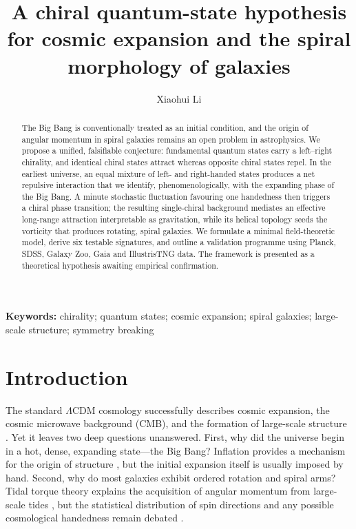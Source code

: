 \documentclass[a4paper,10pt]{article}
\title{\textbf{A chiral quantum-state hypothesis for cosmic expansion and the
       spiral morphology of galaxies}}
\author{Xiaohui Li}
\affil{Independent Researcher, Baoji 721000, China}
\affil{Correspondence: \texttt{danceluck@163.com};
       ORCID: 0009-0003-8233-7191}
\date{}
\providecommand{\keywords}[1]{%
  \vspace{0.5em}\noindent\textbf{Keywords:} #1\par\vspace{0.5em}}
\begin{document}
\maketitle

\begin{abstract}
The Big Bang is conventionally treated as an initial condition, and the origin
of angular momentum in spiral galaxies remains an open problem in
astrophysics. We propose a unified, falsifiable conjecture: fundamental
quantum states carry a left--right chirality, and identical chiral states
attract whereas opposite chiral states repel. In the earliest universe, an
equal mixture of left- and right-handed states produces a net repulsive
interaction that we identify, phenomenologically, with the expanding phase of
the Big Bang. A minute stochastic fluctuation favouring one handedness then
triggers a chiral phase transition; the resulting single-chiral background
mediates an effective long-range attraction interpretable as gravitation,
while its helical topology seeds the vorticity that produces rotating, spiral
galaxies. We formulate a minimal field-theoretic model, derive six testable
signatures, and outline a validation programme using Planck, SDSS, Galaxy
Zoo, Gaia and IllustrisTNG data. The framework is presented as a theoretical
hypothesis awaiting empirical confirmation.
\end{abstract}

\keywords{chirality; quantum states; cosmic expansion; spiral galaxies;
large-scale structure; symmetry breaking}

\section{Introduction}

The standard $\Lambda$CDM cosmology successfully describes cosmic expansion,
the cosmic microwave background (CMB), and the formation of large-scale
structure \cite{planck18,peebles,dodelson}. Yet it leaves two deep questions
unanswered. First, why did the universe begin in a hot, dense, expanding
state---the Big Bang? Inflation provides a mechanism for the origin of
structure \cite{linde}, but the initial expansion itself is usually imposed by
hand. Second, why do most galaxies exhibit ordered rotation and spiral arms?
Tidal torque theory explains the acquisition of angular momentum from
large-scale tides \cite{leepen,codis}, but the statistical distribution of
spin directions and any possible cosmological handedness remain debated
\cite{longo,iye}.
\end{document}
